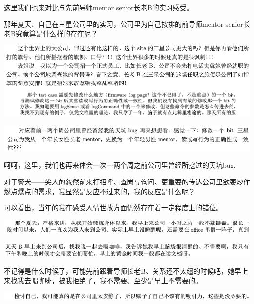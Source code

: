 \documentclass[9pt, b5paper]{article}
\begin{document}
这里我们也来对比与先前导师mentor senior长老B的实习感受。 

那年夏天、自己在三星公司里的实习，公司里为自己按排的前导师mentor senior长老B究竟算是什么样的存在呢？

\begin{center}
\includegraphics[width=.9\linewidth]{./pic/backups_plans_20210512_112101.png}
\end{center}

\begin{center}
\includegraphics[width=.9\linewidth]{./pic/backups_plans_20210512_112040.png}
\end{center}

呵呵，这里，我们也再来体会一次一两个周之前公司里曾经所挖过的天坑bug.

对于警犬——尖人的忽然前来打招呼、查岗与询问、更重要的传达公司里欲要炒作燃点爆点的需求，我显然是反应不过来的，我的反应是什么呢？

可以看出，当年的我在感受人情世故方面仍然存在着一定程度上的错位。

\begin{center}
\includegraphics[width=.9\linewidth]{./pic/backups_plans_20210512_111026.png}
\end{center}

\begin{center}
\includegraphics[width=.9\linewidth]{./pic/backups_plans_20210512_111048.png}
\end{center}

不记得是什么时候了，可能先前跟着导师长老B、关系还不太缰的时候吧，她早上来找我去喝咖啡，被我拒绝了，我不需要、至少是早上不需要的。 

\begin{center}
\includegraphics[width=.9\linewidth]{./pic/backups_plans_20210512_111123.png}
\end{center}
\end{document}

